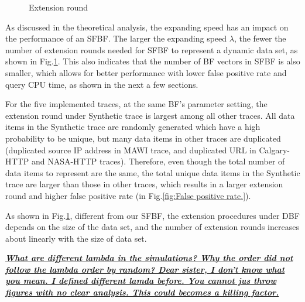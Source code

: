 \documentclass[10pt,journal,letterpaper]{IEEEtran}
\newcommand{\note}[1]{{\sffamily\itshape\bfseries\uline{#1}}}
\begin{document}
\begin{figure}[!htb]
{\label{fig:Extension round test1 actualdata webcache 1.}}
\caption{Extension round}
\label{fig:Extension round.}
\end{figure}

As discussed in the theoretical analysis, the expanding speed has an impact on the performance of an SFBF. The larger the expanding speed $\lambda$, the fewer the number of extension rounds needed for SFBF to represent a dynamic data set, as shown in Fig.\ref{fig:Extension round.}. This also indicates that the number of BF vectors in SFBF is also smaller, which allows for better performance with lower false positive rate and query CPU time, as shown in the next a few sections.

For the five implemented traces, at the same BF's parameter setting, the extension round under Synthetic trace is largest among all other traces. All data items in the Synthetic trace are randomly generated which have a high probability to be unique, but many data items in other traces are duplicated (duplicated source IP address in  MAWI trace, and duplicated URL in Calgary-HTTP and NASA-HTTP traces). Therefore, even though the total number of data items to represent are the same, the total unique data items in the Synthetic trace are larger than those in other traces, which results in a larger extension round and higher false positive rate (in Fig.\ref{fig:False positive rate.}).

As shown in Fig.\ref{fig:Extension round.}, different from our SFBF, the extension procedures under DBF depends on the size of the data set, and the number of extension rounds increases about linearly with the size of data set.

\note{What are different lambda in the simulations? Why the order did not follow the lambda order by random? Dear sister, I don't know what you mean. I defined different lamda before. You cannot jus throw figures with no clear analysis. This could becomes a killing factor.}
\end{document}
